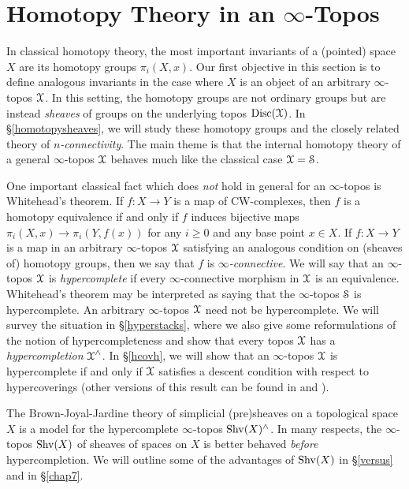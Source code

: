  
\section{Homotopy Theory in an $\infty$-Topos}\label{chap6sec5}

\setcounter{theorem}{0}

In classical homotopy theory, the most important invariants of a (pointed) space
$X$ are its homotopy groups $\pi_{i}(X,x)$. Our first objective in this section is to define analogous invariants in the case where $X$ is an object of an arbitrary $\infty$-topos $\operatorname{\mathcal{X}}$. In this setting, the homotopy groups are not ordinary groups but are instead {\em sheaves} of groups on the underlying topos $\operatorname{Disc}(\operatorname{\mathcal{X}})$. In \S \ref{homotopysheaves}, we will study these homotopy groups
and the closely related theory of {\it $n$-connectivity}. The main theme is that the internal homotopy theory of a general $\infty$-topos $\operatorname{\mathcal{X}}$ behaves much like the classical case $\operatorname{\mathcal{X}} = \operatorname{\mathcal{S}}$.

One important classical fact which does {\em not} hold in general for an $\infty$-topos is Whitehead's theorem. If $f: X \rightarrow Y$ is a map of CW-complexes, then $f$ is a homotopy equivalence if and only if $f$ induces bijective maps $\pi_{i}(X,x) \rightarrow \pi_i(Y, f(x))$ for
any $i \geq 0$ and any base point $x \in X$. If $f: X \rightarrow Y$ is a map in an arbitrary $\infty$-topos $\operatorname{\mathcal{X}}$ satisfying an analogous condition on (sheaves of) homotopy groups, then we say that
$f$ is {\it $\infty$-connective}. We will say that an $\infty$-topos $\operatorname{\mathcal{X}}$ is {\it hypercomplete}
if every $\infty$-connective morphism in $\operatorname{\mathcal{X}}$ is an equivalence. Whitehead's theorem may be interpreted as saying that the $\infty$-topos $\operatorname{\mathcal{S}}$ is hypercomplete. An arbitrary $\infty$-topos $\operatorname{\mathcal{X}}$ need not be hypercomplete. We will survey the situation in \S \ref{hyperstacks}, where we also give some reformulations of the notion of hypercompleteness and show that every topos $\operatorname{\mathcal{X}}$ has a {\it hypercompletion} $\operatorname{\mathcal{X}}^{\wedge}$. In \S \ref{hcovh}, we will show that an $\infty$-topos $\operatorname{\mathcal{X}}$ is hypercomplete if and only if $\operatorname{\mathcal{X}}$ satisfies a descent condition with respect to hypercoverings (other versions of this result can be found in \cite{hollander} and \cite{toen}).

\begin{remark}
The Brown-Joyal-Jardine theory of simplicial (pre)sheaves on a topological space $X$ is a model for the hypercomplete $\infty$-topos $\operatorname{Shv}(X)^{\wedge}$. In many respects, the $\infty$-topos $\operatorname{Shv}(X)$ of sheaves of spaces on $X$ is better behaved {\em before} hypercompletion. We will outline some of the advantages of $\operatorname{Shv}(X)$ in \S \ref{versus} and in \S \ref{chap7}.
\end{remark}

